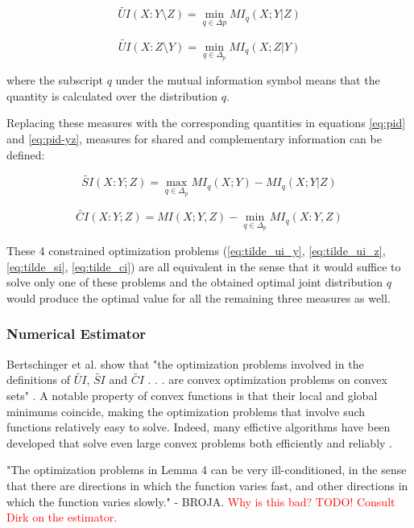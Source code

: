 \documentclass[12pt]{article}
\begin{document}
\begin{equation}
\widetilde{UI}(X:Y \setminus Z) = \min_{q \in \Delta p} MI_q(X;Y|Z)
\label{eq:tilde_ui_y}
\end{equation}

\begin{equation}
\widetilde{UI}(X:Z \setminus Y) = \min_{q \in \Delta_p} MI_q(X;Z|Y)
\label{eq:tilde_ui_z}
\end{equation}

where the subscript $q$ under the mutual information symbol means that the quantity is calculated over the distribution $q$.

Replacing these measures with the corresponding quantities in equations \ref{eq:pid} and \ref{eq:pid-yz}, measures for shared and complementary information can be defined: 

\begin{equation}
\widetilde{SI}(X:Y;Z) = \max_{q \in \Delta_p} MI_q (X;Y) - MI_q(X;Y|Z)
\label{eq:tilde_si}
\end{equation}

\begin{equation}
\widetilde{CI}(X:Y;Z) = MI(X;Y,Z) - \min_{q \in \Delta_p} MI_q(X:Y,Z)
\label{eq:tilde_ci}
\end{equation}

These 4 constrained optimization problems (\ref{eq:tilde_ui_y}, \ref{eq:tilde_ui_z}, \ref{eq:tilde_si}, \ref{eq:tilde_ci}) are all equivalent in the sense that it would suffice to solve only one of these problems and the obtained optimal joint distribution $q$ would produce the optimal value for all the remaining three measures as well. 

\subsubsection{Numerical Estimator}

Bertschinger et al. show that "the optimization problems involved in the definitions of $\widetilde{UI}$, $\widetilde{SI}$ and $\widetilde{CI}$ . . . are convex optimization problems on convex sets" \cite{bertschinger}. A notable property of convex functions is that their local and global minimums coincide, making the optimization problems that involve such functions relatively easy to solve. Indeed, many effictive  algorithms have been developed that solve even large convex problems both efficiently and reliably \cite{boyd}.

"The optimization problems in Lemma 4 can be very ill-conditioned, in the sense that there are directions in which the function varies fast, and other directions in which the function varies slowly." - BROJA. \textcolor{red}{Why is this bad?}
\textcolor{red}{TODO! Consult Dirk on the estimator.}
\end{document}
